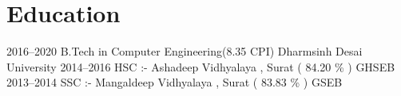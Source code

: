 \documentclass[print]{cv-style}          %
\begin{document}
\begin{comment}
\section{Experience}

\begin{entrylist}
\entry
  {2012-2013}
  {Aastha Solution Surat}
  {Surat, India}
  {\jobtitle{Trainee}\\
  One Year experience as Trainee of ASP.net and Java Developer in Aastha Solution Surat}
\entry
  {2014}
  {Sweetheart Fashion}
  {Surat, India}
  {\jobtitle{Trainee}\\
  Get two month training at Sweetheart Fashion Surat which are basically sales Ethelic Fashion wear Item on different E-Commerce Website like SnapDeal,Flipkart,Amazon and PayTm etc..\\\
  Detailed achievements:
  \begin{itemize}
    \item Get Detail understanding in E-commerce Website.
     
     \item Good Knowledge in CMS data Handling and 'HADOOP' Technology.
     
     
  \end{itemize}}

\end{entrylist}


\end{comment}


\section{Education}

\begin{entrylist}
\entry
{2016--2020}
{B.Tech {\normalfont in Computer Engineering(8.35 CPI)}}
{Dharmsinh Desai University}
{\vspace{-0.3cm}}
\entry
{2014--2016}
{HSC :- {\normalfont Ashadeep Vidhyalaya , Surat ( 84.20 \% ) }}
{GHSEB}
{\vspace{-0.3cm}}
\entry
{2013--2014}
{SSC :- {\normalfont Mangaldeep Vidhyalaya , Surat ( 83.83 \% )}}
{GSEB}
{}

\end{entrylist}
\end{document}

